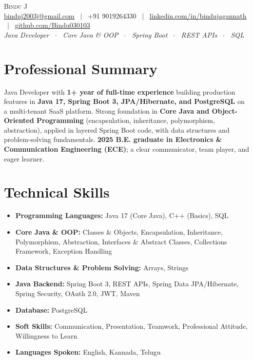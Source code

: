 \documentclass[a4paper,10pt]{article}
\begin{document}
\begin{center}
  {\Huge\scshape\color{navy} Bindu J}\\[5pt]
  \small
  \href{mailto:binduj2003j@gmail.com}{binduj2003j@gmail.com} \ $|$ \
  +91 9019264330 \ $|$ \
  \href{https://www.linkedin.com/in/bindujagannath}{linkedin.com/in/bindujagannath} \ $|$ \
  \href{https://github.com/Bindu030103}{github.com/Bindu030103}\\[3pt]
  {\color{navy}\textit{Java Developer \ $\cdot$ \ Core Java \& OOP \ $\cdot$ \ Spring Boot \ $\cdot$ \
  REST APIs \ $\cdot$ \ SQL}}
\end{center}

\section{Professional Summary}
Java Developer with \textbf{1+ year of full-time experience} building production features in
\textbf{Java 17, Spring Boot 3, JPA/Hibernate, and PostgreSQL} on a multi-tenant SaaS platform.
Strong foundation in \textbf{Core Java and Object-Oriented Programming} (encapsulation,
inheritance, polymorphism, abstraction), applied in layered Spring Boot code, with data structures and
problem-solving fundamentals. \textbf{2025 B.E. graduate in Electronics \& Communication Engineering
(ECE)}; a clear communicator, team player, and eager learner.

\section{Technical Skills}
\begin{itemize}
  \item \textbf{Programming Languages:} Java 17 (Core Java), C++ (Basics), SQL
  \item \textbf{Core Java \& OOP:} Classes \& Objects, Encapsulation, Inheritance, Polymorphism,
        Abstraction, Interfaces \& Abstract Classes, Collections Framework, Exception Handling
  \item \textbf{Data Structures \& Problem Solving:} Arrays, Strings
  \item \textbf{Java Backend:} Spring Boot 3, REST APIs, Spring Data JPA/Hibernate, Spring Security,
        OAuth 2.0, JWT, Maven
  \item \textbf{Database:} PostgreSQL
  \item \textbf{Soft Skills:} Communication, Presentation, Teamwork, Professional Attitude,
        Willingness to Learn
  \item \textbf{Languages Spoken:} English, Kannada, Telugu
\end{itemize}
\end{document}
